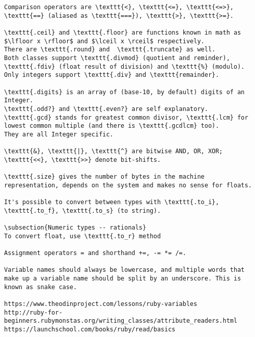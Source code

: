 \documentclass{a5charun}
\begin{document}
\begin{verbatim}
Comparison operators are \texttt{<}, \texttt{<=}, \texttt{<=>}, \texttt{==} (aliased as \texttt{===}), \texttt{>}, \texttt{>=}.

\texttt{.ceil} and \texttt{.floor} are functions known in math as $\lfloor x \rfloor$ and $\lceil x \rceil$ respectively.
There are \texttt{.round} and  \texttt{.truncate} as well.
Both classes support \texttt{.divmod} (quotient and reminder), \texttt{.fdiv} (float result of division) and \texttt{%} (modulo).
Only integers support \texttt{.div} and \texttt{remainder}.

\texttt{.digits} is an array of (base-10, by default) digits of an Integer.
\texttt{.odd?} and \texttt{.even?} are self explanatory.
\texttt{.gcd} stands for greatest common divisor, \texttt{.lcm} for lowest common multiple (and there is \texttt{.gcdlcm} too).
They are all Integer specific.

\texttt{&}, \texttt{|}, \texttt{^} are bitwise AND, OR, XOR;
\texttt{<<}, \texttt{>>} denote bit-shifts.

\texttt{.size} gives the number of bytes in the machine representation, depends on the system and makes no sense for floats.

It's possible to convert between types with \texttt{.to_i}, \texttt{.to_f}, \texttt{.to_s} (to string).

\subsection{Numeric types -- rationals}
To convert float, use \texttt{.to_r} method

Assignment operators = and shorthand +=, -= *= /=.

Variable names should always be lowercase, and multiple words that make up a variable name should be split by an underscore. This is known as snake case.

https://www.theodinproject.com/lessons/ruby-variables
http://ruby-for-beginners.rubymonstas.org/writing_classes/attribute_readers.html
https://launchschool.com/books/ruby/read/basics
\end{verbatim}
\end{document}

